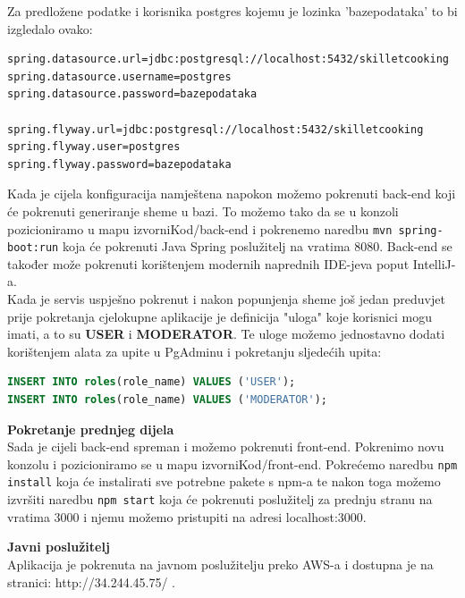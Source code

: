 Za predložene podatke i korisnika postgres kojemu je lozinka 'bazepodataka' to bi izgledalo ovako:
\begin{lstlisting}[]
spring.datasource.url=jdbc:postgresql://localhost:5432/skilletcooking
spring.datasource.username=postgres
spring.datasource.password=bazepodataka

spring.flyway.url=jdbc:postgresql://localhost:5432/skilletcooking
spring.flyway.user=postgres
spring.flyway.password=bazepodataka
\end{lstlisting}
Kada je cijela konfiguracija namještena napokon možemo pokrenuti back-end koji će pokrenuti generiranje sheme u bazi. To možemo tako da se u konzoli pozicioniramo u mapu izvorniKod/back-end i pokrenemo naredbu \lstinline|mvn spring-boot:run| koja će pokrenuti Java Spring poslužitelj na vratima 8080. Back-end se također može pokrenuti korištenjem modernih naprednih IDE-jeva poput IntelliJ-a.\\
Kada je servis uspješno pokrenut i nakon popunjenja sheme još jedan preduvjet prije pokretanja cjelokupne aplikacije je definicija "uloga" koje korisnici mogu imati, a to su \textbf{USER} i \textbf{MODERATOR}. Te uloge možemo jednostavno dodati korištenjem alata za upite u PgAdminu i pokretanju sljedećih upita:
\begin{lstlisting}[language=sql]
INSERT INTO roles(role_name) VALUES ('USER');
INSERT INTO roles(role_name) VALUES ('MODERATOR');
\end{lstlisting}
\textbf{Pokretanje prednjeg dijela}\\
Sada je cijeli back-end spreman i možemo pokrenuti front-end. Pokrenimo novu konzolu i pozicioniramo se u mapu izvorniKod/front-end. Pokrećemo naredbu \lstinline|npm install| koja će instalirati sve potrebne pakete s npm-a te nakon toga možemo izvršiti naredbu \lstinline|npm start| koja će pokrenuti poslužitelj za prednju stranu na vratima 3000 i njemu možemo pristupiti na adresi localhost:3000.

\hfill \break
\textbf{Javni poslužitelj}\\
Aplikacija je pokrenuta na javnom poslužitelju preko AWS-a i dostupna je na stranici: http://34.244.45.75/ .
\eject
